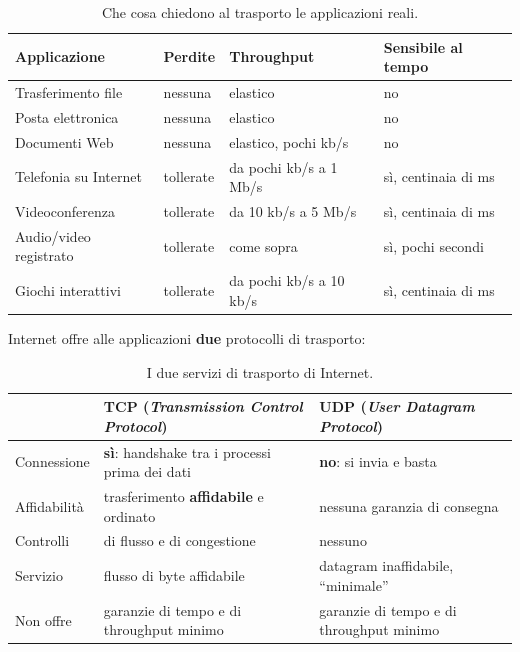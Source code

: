 \begin{table}[H]
\centering
\begin{tabular}{llll}
\toprule
\textbf{Applicazione} & \textbf{Perdite} & \textbf{Throughput} & \textbf{Sensibile al tempo} \\
\midrule
Trasferimento file & nessuna & elastico & no \\
Posta elettronica & nessuna & elastico & no \\
Documenti Web & nessuna & elastico, pochi kb/s & no \\
Telefonia su Internet & tollerate & da pochi kb/s a 1 Mb/s & sì, centinaia di ms \\
Videoconferenza & tollerate & da 10 kb/s a 5 Mb/s & sì, centinaia di ms \\
Audio/video registrato & tollerate & come sopra & sì, pochi secondi \\
Giochi interattivi & tollerate & da pochi kb/s a 10 kb/s & sì, centinaia di ms \\
\bottomrule
\end{tabular}
\caption{Che cosa chiedono al trasporto le applicazioni reali.}
\end{table}


Internet offre alle applicazioni \textbf{due} protocolli di trasporto:

\begin{table}[H]
\centering
\begin{tabular}{p{2.3cm}p{6cm}p{6cm}}
\toprule
 & \textbf{TCP} (\emph{Transmission Control Protocol}) & \textbf{UDP} (\emph{User Datagram Protocol}) \\
\midrule
Connessione & \textbf{sì}: handshake tra i processi prima dei dati & \textbf{no}: si invia e basta \\
Affidabilità & trasferimento \textbf{affidabile} e ordinato & nessuna garanzia di consegna \\
Controlli & di flusso e di congestione & nessuno \\
Servizio & flusso di byte affidabile & datagram inaffidabile, ``minimale'' \\
Non offre & garanzie di tempo e di throughput minimo & garanzie di tempo e di throughput minimo \\
\bottomrule
\end{tabular}
\caption{I due servizi di trasporto di Internet.}
\end{table}

